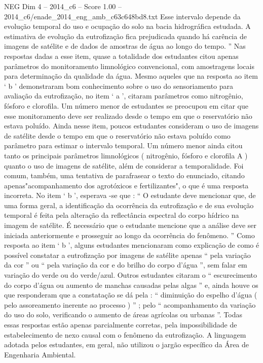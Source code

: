 \begin{textsample}{NEG Dim 4 – 2014\_c6 – Score 1.00 – 2014\_c6/enade\_2014\_eng\_amb\_c63c648bd8.txt}
Esse intervalo depende da evolução temporal do uso e ocupação do solo na bacia hidrográfica estudada.
A estimativa de evolução da eutrofização fica prejudicada quando há carência de imagens de satélite e de dados de amostras de água ao longo do tempo. ” Nas respostas dadas a esse item, quase a totalidade dos estudantes citou apenas parâmetros do monitoramento limnológico convencional, com amostragens locais para determinação da qualidade da água.
Mesmo aqueles que na resposta ao item ‘ b ’ demonstraram bom conhecimento sobre o uso do sensoriamento para avaliação da eutrofização, no item ‘ a ’, citaram parâmetros como nitrogênio, fósforo e clorofila.
Um número menor de estudantes se preocupou em citar que esse monitoramento deve ser realizado desde o tempo em que o reservatório não estava poluído.
Ainda nesse item, poucos estudantes consideram o uso de imagens de satélite desde o tempo em que o reservatório não estava poluído como parâmetro para estimar o intervalo temporal.
Um número menor ainda citou tanto os principais parâmetros limnológicos ( nitrogênio, fósforo e clorofila A ) quanto o uso de imagens de satélite, além de considerar a temporalidade.
Foi comum, também, uma tentativa de parafrasear o texto do enunciado, citando apenas"acompanhamento dos agrotóxicos e fertilizantes", o que é uma resposta incorreta.
No item ‘ b ’, esperava -se que : “ O estudante deve mencionar que, de uma forma geral, a identificação da ocorrência da eutrofização e de sua evolução temporal é feita pela alteração da reflectância espectral do corpo hídrico na imagem de satélite.
É necessário que o estudante mencione que a análise deve ser iniciada anteriormente e prosseguir ao longo da ocorrência do fenômeno. ” Como resposta ao item ‘ b ’, alguns estudantes mencionaram como explicação de como é possível constatar a eutrofização por imagens de satélite apenas “ pela variação da cor ” ou “ pela variação da cor e do brilho do corpo d’água ”, sem falar em variação do verde ou do verde/azul.
Outros estudantes citaram o “ escurecimento do corpo d’água ou aumento de manchas causadas pelas algas ” e, ainda houve os que responderam que a constatação se dá pela : “ diminuição do espelho d’água ( pelo assoreamento inerente ao processo ) ” ; pelo “ acompanhamento da variação do uso do solo, verificando o aumento de áreas agrícolas ou urbanas ”.
Todas essas respostas estão apenas parcialmente corretas, pela impossibilidade de estabelecimento de nexo causal com o fenômeno da eutrofização.
A linguagem adotada pelos estudantes, em geral, não utilizou o jargão específico da Área de Engenharia Ambiental.

\end{textsample}
